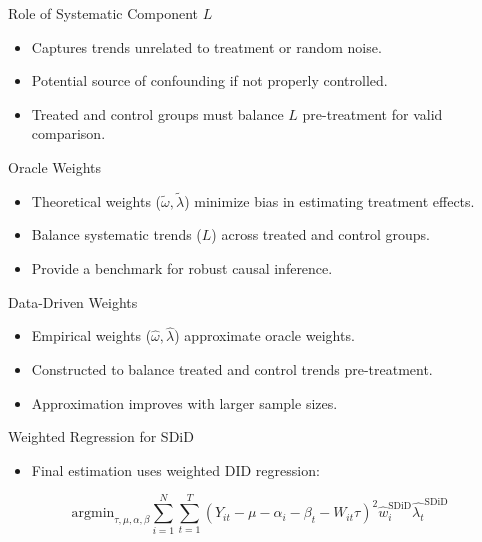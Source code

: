 \documentclass{beamer}
\begin{document}
\begin{frame}{Role of Systematic Component \(L\)}
\begin{itemize}
\item Captures trends unrelated to treatment or random noise.
\item Potential source of confounding if not properly controlled.
\item Treated and control groups must balance \(L\) pre-treatment for valid comparison.
\end{itemize}
\end{frame}

\begin{frame}{Oracle Weights}
\begin{itemize}
\item Theoretical weights (\(\tilde{\omega}, \tilde{\lambda}\)) minimize bias in estimating treatment effects.
\item Balance systematic trends (\(L\)) across treated and control groups.
\item Provide a benchmark for robust causal inference.
\end{itemize}
\end{frame}

\begin{frame}{Data-Driven Weights}
\begin{itemize}
\item Empirical weights (\(\hat{\omega}, \hat{\lambda}\)) approximate oracle weights.
\item Constructed to balance treated and control trends pre-treatment.
\item Approximation improves with larger sample sizes.
\end{itemize}
\end{frame}

\begin{frame}{Weighted Regression for SDiD}

\begin{itemize}
    \item Final estimation uses weighted DID regression:
\end{itemize}

\[
\textrm{argmin}_{\tau, \mu, \alpha, \beta} \sum_{i=1}^N \sum_{t=1}^T \left( Y_{it} - \mu - \alpha_i - \beta_t - W_{it}\tau \right)^2 \widehat{w}_i^{\text{SDiD}} \widehat{\lambda_t}^{\text{SDiD}}
\]

\end{frame}
\end{document}
